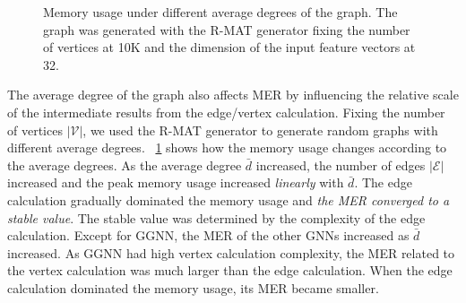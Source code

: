 \begin{figure}
    \centering
    \caption{Memory usage under different average degrees of the graph. The graph was generated with the R-MAT generator fixing the number of vertices at 10K and the dimension of the input feature vectors at 32.}
    \label{fig:exp_memory_expansion_ratio_input_graph_number_of_edges}
\end{figure}

The average degree of the graph also affects MER by influencing the relative scale of the intermediate results from the edge/vertex calculation.
Fixing the number of vertices $|\mathcal{V}|$, we used the R-MAT generator to generate random graphs with different average degrees.
\figurename~\ref{fig:exp_memory_expansion_ratio_input_graph_number_of_edges} shows how the memory usage changes according to the average degrees.
As the average degree $\bar{d}$ increased, the number of edges $|\mathcal{E}|$ increased and the peak memory usage increased \emph{linearly} with $\bar{d}$.
The edge calculation gradually dominated the memory usage and \emph{the MER converged to a stable value}.
The stable value was determined by the complexity of the edge calculation.
Except for GGNN, the MER of the other GNNs increased as $\bar{d}$ increased.
As GGNN had high vertex calculation complexity, the MER related to the vertex calculation was much larger than the edge calculation.
When the edge calculation dominated the memory usage, its MER became smaller.

